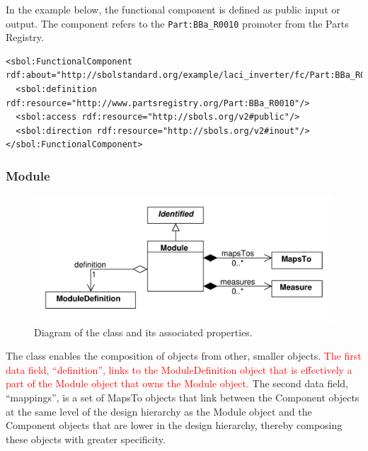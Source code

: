 In the example below, the functional component is defined as public input or output. The component refers to the \texttt{Part:BBa\_R0010} promoter from the Parts Registry.
\begin{lstlisting}
<sbol:FunctionalComponent rdf:about="http://sbolstandard.org/example/laci_inverter/fc/Part:BBa_R0010">
  <sbol:definition rdf:resource="http://www.partsregistry.org/Part:BBa_R0010"/>
  <sbol:access rdf:resource="http://sbols.org/v2#public"/>
  <sbol:direction rdf:resource="http://sbols.org/v2#inout"/>
</sbol:FunctionalComponent>
\end{lstlisting}

\subsubsection{Module}
\label{sec:Module}

\begin{figure}[ht]
\begin{center}
\includegraphics[scale=0.6]{uml/module}
\caption[]{Diagram of the  class and its associated properties.}
\label{uml:module}
\end{center}
\end{figure}

The  class enables the composition of  objects from other, smaller  objects. \textcolor{red}{The first data field, ``definition'', links to the ModuleDefinition object that is effectively a part of the Module object that owns the Module object.} The second data field, ``mappings'', is a set of MapsTo objects that link between the Component objects at the same level of the design hierarchy as the Module object and the Component objects that are lower in the design hierarchy, thereby composing these objects with greater specificity.


